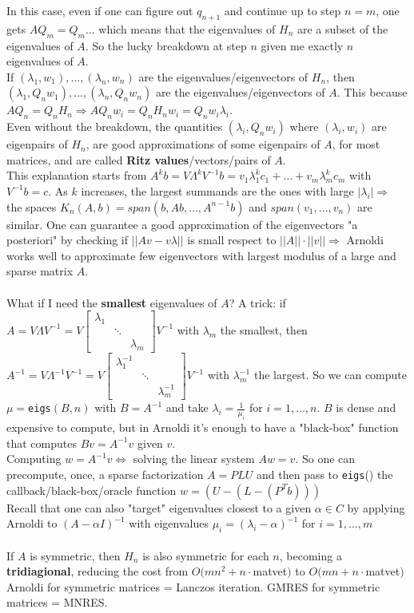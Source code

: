 \documentclass[10pt]{report}
\begin{document}
In this case, even if one can figure out $q_{n+1}$ and continue up to step $n=m$, one gets $AQ_m = Q_m\ldots$ which means that the eigenvalues of $H_n$ are a subset of the eigenvalues of $A$. So the lucky breakdown at step $n$ given me exactly $n$ eigenvalues of $A$.\\
If $(\lambda_1,w_1),\ldots,(\lambda_n,w_n)$ are the eigenvalues/eigenvectors of $H_n$, then $(\lambda_1,Q_nw_1),\ldots,(\lambda_n,Q_nw_n)$ are the eigenvalues/eigenvectors of $A$. This because $AQ_n = Q_nH_n \Rightarrow AQ_nw_i = Q_nH_nw_i = Q_nw_i\lambda_i$.\\
Even without the breakdown, the quantities $(\lambda_i, Q_nw_i)$ where $(\lambda_i, w_i)$ are eigenpairs of $H_n$, are good approximations of some eigenpairs of $A$, for most matrices, and are called \textbf{Ritz values}/vectors/pairs of $A$.\\
This explanation starts from $A^kb = V \Lambda^k V^{-1} b = v_1\lambda_1^kc_1+\ldots+v_m\lambda_m^kc_m$ with $V^{-1}b = c$. As $k$ increases, the largest summands are the ones with large $|\lambda_i| \Rightarrow$ the spaces $K_n(A,b)=span(b,Ab,\ldots,A^{n-1}b)$ and $span(v_1,\ldots,v_n)$ are similar. One can guarantee a good approximation of the eigenvectors "a posteriori" by checking if $||Av-v\lambda||$ is small respect to $||A||\cdot||v||\Rightarrow$ Arnoldi works well to approximate few eigenvectors with largest modulus of a large and sparse matrix $A$.\\\\
What if I need the \textbf{smallest} eigenvalues of $A$? A trick: if $A=V\Lambda V^{-1} = V\left[\begin{array}{ccc}
\lambda_1\\
&\ddots\\
& &\lambda_m
\end{array}\right]V^{-1}$ with $\lambda_m$ the smallest, then $A^{-1}=V\Lambda^{-1} V^{-1} = V\left[\begin{array}{ccc}
\lambda_1^{-1}\\
&\ddots\\
& &\lambda_m^{-1}
\end{array}\right]V^{-1}$ with $\lambda_m^{-1}$ the largest. So we can compute $\mu=$\texttt{eigs}$(B,n)$ with $B=A^{-1}$ and take $\lambda_i = \frac{1}{\mu_i}$ for $i=1,\ldots,n$. $B$ is dense and expensive to compute, but in Arnoldi it's enough to have a "black-box" function that computes $Bv=A^{-1}v$ given $v$.\\
Computing $w=A^{-1}v \Leftrightarrow$ solving the linear system $Aw=v$. So one can precompute, once, a sparse factorization $A=PLU$ and then pass to \texttt{eigs}() the callback/black-box/oracle function $w = (U-(L-(P^Tb)))$\\
Recall that one can also "target" eigenvalues closest to a given $\alpha\in C$ by applying Arnoldi to $(A-\alpha I)^{-1}$ with eigenvalues $\mu_i = (\lambda_i-\alpha)^{-1}$ for $i=1,\ldots,m$\\\\
If $A$ is symmetric, then $H_n$ is also symmetric for each $n$, becoming a \textbf{tridiagional}, reducing the cost from $O(mn^2+n\cdot$matvet$)$ to $O(mn+n\cdot$matvet$)$\\
Arnoldi for symmetric matrices = Lanczos iteration. GMRES for symmetric matrices = MNRES.
\end{document}
